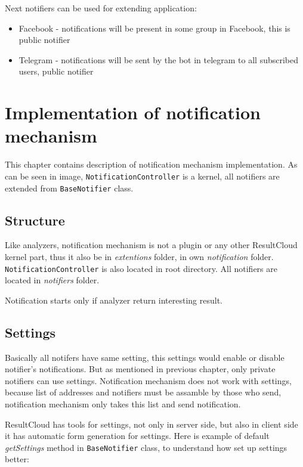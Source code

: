 Next notifiers can be used for extending application:

\begin{itemize} 
\item Facebook - notifications will be present in some group in Facebook, this is public notifier
\item Telegram - notifications will be sent by the bot in telegram to all subscribed users, public notifier
\end{itemize}

\chapter{Implementation of notification mechanism}
\label{ch:notification_implement}

This chapter contains description of notification mechanism implementation. As can be seen in image, \texttt{NotificationController} is a kernel, all notifiers are extended from \texttt{BaseNotifier} class.

\section{Structure}

Like analyzers, notification mechanism is not a plugin or any other ResultCloud kernel part, thus it also be in \emph{extentions} folder, in own \emph{notification} folder. \texttt{NotificationController} is also located in root directory. All notifiers are located in \emph{notifiers} folder.

Notification starts only if analyzer return interesting result.

\section{Settings}

Basically all notifers have same setting, this settings would enable or disable notifier's notifications. But as mentioned in previous chapter, only private notifiers can use settings. Notification mechanism does not work with settings, because list of addresses and notifiers must be assamble by those who send, notification mechanism only takes this list and send notification. 

ResultCloud has tools for settings, not only in server side, but also in client side it has automatic form generation for settings. Here is example of default \emph{getSettings} method in \texttt{BaseNotifier} class, to understand how set up settings better:

